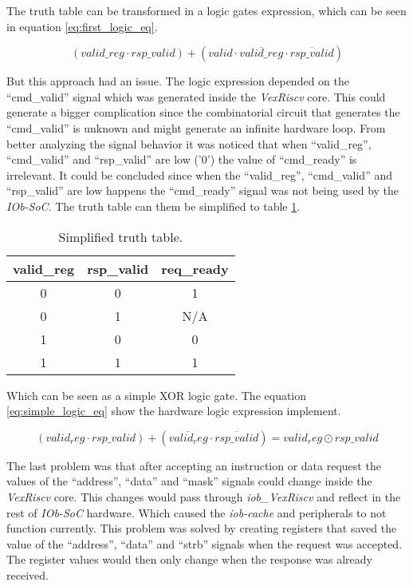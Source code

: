 The truth table can be transformed in a logic gates expression, which can be seen in equation \ref{eq:first_logic_eq}.

\begin{equation}
  (valid\_reg \cdot rsp\_valid) + (valid \cdot \overline{valid\_reg} \cdot \overline{rsp\_valid})
  \label{eq:first_logic_eq}
\end{equation}

But this approach had an issue. The logic expression depended on the \enquote{cmd\_valid} signal which was generated inside the \textit{VexRiscv} core. This could generate a bigger complication since the combinatorial circuit that generates the \enquote{cmd\_valid} is unknown and might generate an infinite hardware loop. From better analyzing the signal behavior it was noticed that when \enquote{valid\_reg}, \enquote{cmd\_valid} and \enquote{rsp\_valid} are low ('0') the value of \enquote{cmd\_ready} is irrelevant. It could be concluded since when the \enquote{valid\_reg}, \enquote{cmd\_valid} and \enquote{rsp\_valid} are low happens the \enquote{cmd\_ready} signal was not being used by the \textit{IOb-SoC}. The truth table can them be simplified to table \ref{tab:simple_truth_table}.

\begin{table}[!ht]
  \centering
  \begin{tabular}{cc|c}
  valid\_reg & rsp\_valid & req\_ready \\ \hline
  0          & 0          & 1          \\
  0          & 1          & N/A        \\
  1          & 0          & 0          \\
  1          & 1          & 1         
  \end{tabular}
  \caption{Simplified truth table.}
  \label{tab:simple_truth_table}
\end{table}

Which can be seen as a simple XOR logic gate. The equation \ref{eq:simple_logic_eq} show the hardware logic expression implement.

\begin{equation}
  (valid_reg \cdot rsp\_valid) + (\overline{valid_reg} \cdot \overline{rsp\_valid}) = valid_reg \odot rsp\_valid
  \label{eq:simple_logic_eq}
\end{equation}

The last problem was that after accepting an instruction or data request the values of the \enquote{address}, \enquote{data} and \enquote{mask} signals could change inside the \textit{VexRiscv} core. This changes would pass through \textit{iob\_VexRiscv} and reflect in the rest of \textit{IOb-SoC} hardware. Which caused the \textit{iob-cache} and peripherals to not function currently. This problem was solved by creating registers that saved the value of the \enquote{address}, \enquote{data} and \enquote{strb} signals when the request was accepted. The register values would then only change when the response was already received.

